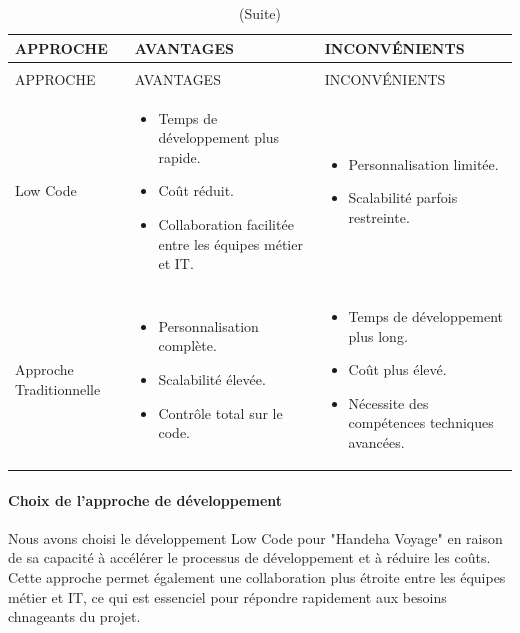 \documentclass[12pt]{report}
\begin{document}
				\begin{longtable}{|p{3cm}|p{5.5cm}|p{5.5cm}|}
						\caption{Comparaison entre Low Code et Approche Traditionnelle.}
						\label{tab:tableau 12}\\ 
						\hline 
						APPROCHE & AVANTAGES & INCONVÉNIENTS\\ 
						\hline 
						\endfirsthead 	
						\caption[]{(Suite)}\\ 
						\hline 
						APPROCHE & AVANTAGES & INCONVÉNIENTS\\ 
						\hline 
						\endhead
						Low Code &
						\begin{itemize}
							\item Temps de développement plus rapide.
							\item Coût réduit.
							\item Collaboration facilitée entre les équipes métier et IT.
						\end{itemize}
						&
						\begin{itemize}
							\item Personnalisation limitée.
							\item Scalabilité parfois restreinte.
						\end{itemize}\\						
						\hline
						Approche Traditionnelle &
						\begin{itemize}
							\item Personnalisation complète.
							\item Scalabilité élevée.
							\item Contrôle total sur le code.
						\end{itemize} &
						\begin{itemize}
							\item Temps de développement plus long.
							\item Coût plus élevé.
							\item Nécessite des compétences techniques avancées.
						\end{itemize} \\
						\hline
				    \end{longtable}

				
				\paragraph{Choix de l'approche de développement}
				
				Nous avons choisi le développement Low Code pour "Handeha Voyage" en raison de sa capacité à accélérer le processus de développement et à réduire les coûts. Cette approche permet également une collaboration plus étroite entre les équipes métier et IT, ce qui est essenciel pour répondre rapidement aux besoins chnageants du projet.
\end{document}
